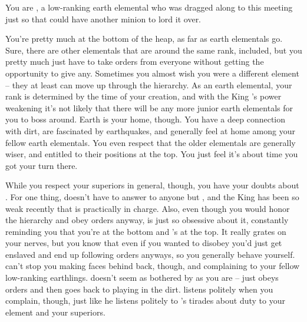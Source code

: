 \documentclass[char]{elementals}
\begin{document}
\name{\cMiniEarth{}}

You are \cMiniEarth{\intro}, a low-ranking earth elemental who was dragged along to this meeting just so that \cLoyal{\intro} could have another minion to lord it over.

You're pretty much at the bottom of the heap, as far as earth elementals go.  Sure, there are other elementals that are around the same rank, \cMinion{\intro} included, but you pretty much just have to take orders from everyone without getting the opportunity to give any.  Sometimes you almost wish you were a different element -- they at least can move up through the hierarchy.  As an earth elemental, your rank is determined by the time of your creation, and with the King \cEarthKing{}'s power weakening it's not likely that there will be any more junior earth elementals for you to boss around.  Earth is your home, though.  You have a deep connection with dirt, are fascinated by earthquakes, and generally feel at home among your fellow earth elementals.  You even respect that the older elementals are generally wiser, and entitled to their positions at the top.  You just feel it's about time you got your turn there.

While you respect your superiors in general, though, you have your doubts about \cLoyal{}.  For one thing, \cLoyal{\they} doesn't have to answer to anyone but \cEarthKing{}, and the King has been so weak recently that \cLoyal{} is practically in charge.  Also, even though you would honor the hierarchy and obey orders anyway, \cLoyal{\they} is just so obsessive about it, constantly reminding you that you're at the bottom and \cLoyal{\they}'s at the top.  It really grates on your nerves, but you know that even if you wanted to disobey you'd just get enslaved and end up following orders anyways, so you generally behave yourself.  \cLoyal{} can't stop you making faces behind \cLoyal{\their} back, though, and complaining to your fellow low-ranking earthlings.  \cMinion{} doesn't seem as bothered by \cLoyal{} as you are -- \cMinion{\they} just obeys orders and then goes back to playing in the dirt.  \cMinion{\They} listens politely when you complain, though, just like he listens politely to \cLoyal{}'s tirades about duty to your element and your superiors.
\end{document}
